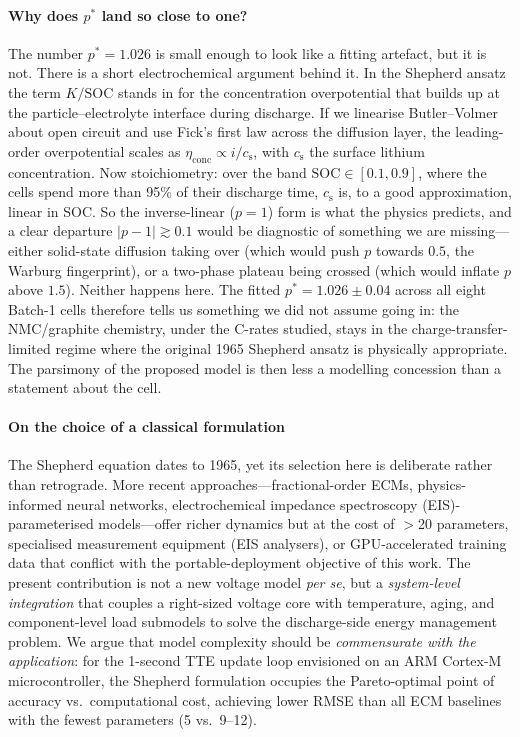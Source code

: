 \documentclass[5p,times,number]{elsarticle}
\begin{document}
\paragraph{Why does $p^{*}$ land so close to one?}
The number $p^{*}=1.026$ is small enough to look like a fitting artefact, but it is not. There is a short electrochemical argument behind it. In the Shepherd ansatz the term $K/\mathrm{SOC}$ stands in for the concentration overpotential that builds up at the particle--electrolyte interface during discharge. If we linearise Butler--Volmer about open circuit and use Fick's first law across the diffusion layer, the leading-order overpotential scales as $\eta_\mathrm{conc} \propto i / c_\mathrm{s}$, with $c_\mathrm{s}$ the surface lithium concentration. Now stoichiometry: over the band $\mathrm{SOC}\in[0.1, 0.9]$, where the cells spend more than 95\% of their discharge time, $c_\mathrm{s}$ is, to a good approximation, linear in SOC. So the inverse-linear ($p=1$) form is what the physics predicts, and a clear departure $|p-1|\gtrsim 0.1$ would be diagnostic of something we are missing---either solid-state diffusion taking over (which would push $p$ towards $0.5$, the Warburg fingerprint), or a two-phase plateau being crossed (which would inflate $p$ above $1.5$). Neither happens here. The fitted $p^{*}=1.026 \pm 0.04$ across all eight Batch-1 cells therefore tells us something we did not assume going in: the NMC/graphite chemistry, under the C-rates studied, stays in the charge-transfer-limited regime where the original 1965 Shepherd ansatz is physically appropriate. The parsimony of the proposed model is then less a modelling concession than a statement about the cell.

\paragraph{On the choice of a classical formulation}
The Shepherd equation dates to 1965, yet its selection here is deliberate rather than retrograde.
More recent approaches---fractional-order ECMs, physics-informed neural networks, electrochemical impedance spectroscopy (EIS)-parameterised models---offer richer dynamics but at the cost of $>$20 parameters, specialised measurement equipment (EIS analysers), or GPU-accelerated training data that conflict with the portable-deployment objective of this work.
The present contribution is not a new voltage model \emph{per se}, but a \emph{system-level integration} that couples a right-sized voltage core with temperature, aging, and component-level load submodels to solve the discharge-side energy management problem.
We argue that model complexity should be \emph{commensurate with the application}: for the 1-second TTE update loop envisioned on an ARM Cortex-M microcontroller, the Shepherd formulation occupies the Pareto-optimal point of accuracy vs.\ computational cost, achieving lower RMSE than all ECM baselines with the fewest parameters (5 vs.\ 9--12).
\end{document}

